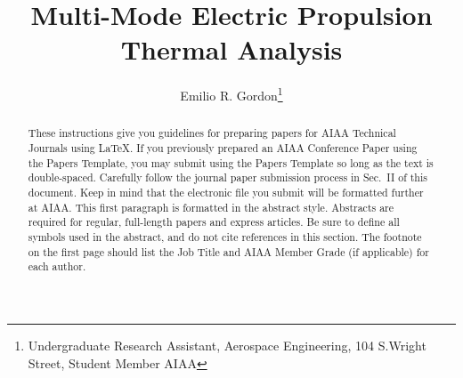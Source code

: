 \documentclass[journal]{new-aiaa}
\title{Multi-Mode Electric Propulsion Thermal Analysis}
\author{Emilio R. Gordon\footnote{Undergraduate Research Assistant, Aerospace Engineering, 104 S.Wright Street, Student Member AIAA}}
\affil{University of Illinois at Urbana-Champaign, Urbana, IL 61801}
\begin{document}
\maketitle

\begin{abstract}
These instructions give you guidelines for preparing papers for AIAA Technical Journals using \LaTeX{}. If you previously prepared an AIAA Conference Paper using the Papers Template, you may submit using the Papers Template so long as the text is double-spaced.  Carefully follow the journal paper submission process in Sec.~II of this document. Keep in mind that the electronic file you submit will be formatted further at AIAA. This first paragraph is formatted in the abstract style. Abstracts are required for regular, full-length papers and express articles. Be sure to define all symbols used in the abstract, and do not cite references in this section. The footnote on the first page should list the Job Title and AIAA Member Grade (if applicable) for each author.
\end{abstract}
%
%
%
%
%
%
\end{document}
